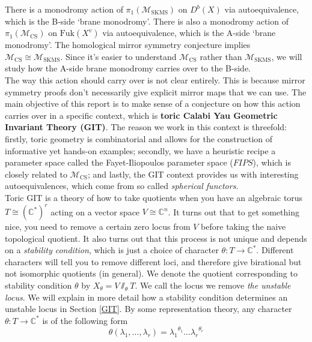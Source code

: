 \documentclass[oneside,reqno]{amsart}
\theoremstyle{definition}
\theoremstyle{definition}
\theoremstyle{definition}
\theoremstyle{definition}
\newcommand{\CC}{\mathbb{C}}
\begin{document}
\newline
There is a monodromy action of $\pi_1(\mathcal{M}_{\text{SKMS}})$ on $D^b(X)$ via autoequivalence, which is the B-side `brane monodromy'. There is also a monodromy action of $\pi_1(\mathcal{M}_{\text{CS}})$ on $\text{Fuk}(X^v)$ via autoequivalence, which is the A-side `brane monodromy'. The homological mirror symmetry conjecture implies $\mathcal{M}_{\text{CS}} \cong \mathcal{M}_{\text{SKMS}}$. Since it's easier to understand $\mathcal{M}_{\text{CS}}$ rather than $\mathcal{M}_{\text{SKMS}}$, we will study how the A-side brane monodromy carries over to the B-side. \\
\newline
The way this action should carry over is not clear entirely. This is because mirror symmetry proofs don't necessarily give explicit mirror maps that we can use. The main objective of this report is to make sense of a conjecture on how this action carries over in a specific context, which is \textbf{toric Calabi Yau  Geometric Invariant Theory (GIT)}. The reason we work in this context is threefold: firstly, toric geometry is combinatorial and allows for the construction of informative yet hands-on examples; secondly, we have a heuristic recipe a parameter space called the Fayet-Iliopoulos parameter space ($FIPS$), which is closely related to $\mathcal{M}_{\text{CS}}$; and lastly, the GIT context provides us with interesting autoequivalences, which come from so called \textit{spherical functors}.\\
\newline
Toric GIT is a theory of how to take quotients when you have an algebraic torus $T \cong (\CC^*)^r$ acting on a vector space $V\cong \CC^n$. It turns out that to get something nice, you need to remove a certain zero locus from $V$ before taking the naive topological quotient. It also turns out that this process is not unique and depends on a \textit{stability condition}, which is just a choice of character $\theta: T \to \CC^*$. Different characters will tell you to remove different loci, and therefore give birational but not isomorphic quotients (in general). We denote the quotient corresponding to stability condition $\theta$ by $X_{\theta}=V \sslash_{\theta} T$. We call the locus we remove \textit{the unstable locus}. We will explain in more detail how a stability condition determines an unstable locus in Section \ref{GIT}. By some representation theory, any character $\theta: T \to \CC^*$ is of the following form
$$
\theta(\lambda_1, \dots, \lambda_r) = {\lambda_1}^{\theta_1} \dots {\lambda_r}^{\theta_r} 
$$
\end{document}
